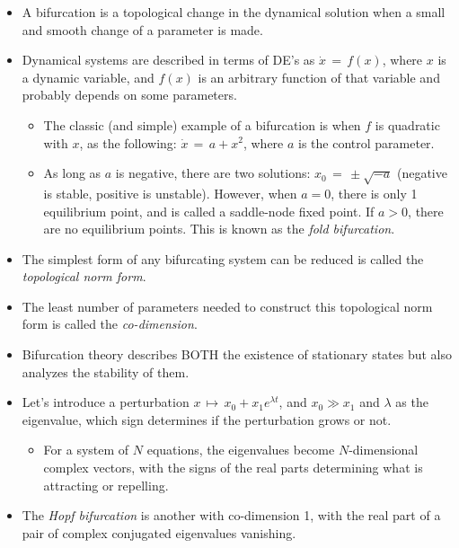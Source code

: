 \documentclass[a4paper]{article}
\begin{document}
\begin{itemize}
\item
  A bifurcation is a topological change in the dynamical solution when a
  small and smooth change of a parameter is made.
\item
  Dynamical systems are described in terms of DE's as
  $\dot{x} \,=\, f(x)$, where $x$ is a dynamic variable, and $f(x)$ is
  an arbitrary function of that variable and probably depends on some
  parameters.

  \begin{itemize}
  \item
    The classic (and simple) example of a bifurcation is when $f$ is
    quadratic with $x$, as the following: $\dot{x} \,=\, a + x^2$, where
    $a$ is the control parameter.
  \item
    As long as $a$ is negative, there are two solutions:
    $x_0 \,=\, \pm\sqrt{-a}$ (negative is stable, positive is unstable).
    However, when $a = 0$, there is only 1 equilibrium point, and is
    called a saddle-node fixed point. If $a > 0$, there are no
    equilibrium points. This is known as the \emph{fold bifurcation}.
  \end{itemize}
\item
  The simplest form of any bifurcating system can be reduced is called
  the \emph{topological norm form}.
\item
  The least number of parameters needed to construct this topological
  norm form is called the \emph{co-dimension}.
\item
  Bifurcation theory describes BOTH the existence of stationary states
  but also analyzes the stability of them.
\item
  Let's introduce a perturbation
  $x \,\mapsto\, x_0 + x_1 e^{\lambda t}$, and $x_0 \gg x_1$ and
  $\lambda$ as the eigenvalue, which sign determines if the perturbation
  grows or not.

  \begin{itemize}
  \itemsep1pt\parskip0pt
  \item
    For a system of $N$ equations, the eigenvalues become
    $N$-dimensional complex vectors, with the signs of the real parts
    determining what is attracting or repelling.
  \end{itemize}
\item
  The \emph{Hopf bifurcation} is another with co-dimension 1, with the
  real part of a pair of complex conjugated eigenvalues vanishing.


\end{itemize}
\end{document}
